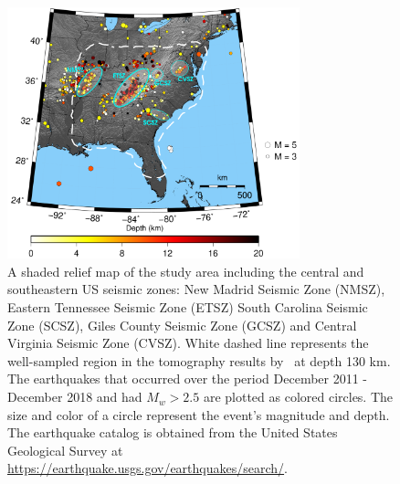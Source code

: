 \documentclass[draft,linenumbers]{agujournal2018}
\begin{document}
\begin{figure}[ht]
    \centering
    \includegraphics[width=20pc]{figures/seismicity_new.png}
    \caption{ A shaded relief map of the study area including the central and southeastern US seismic zones: New Madrid Seismic Zone (NMSZ), Eastern Tennessee  Seismic Zone (ETSZ) South Carolina Seismic Zone (SCSZ), Giles County Seismic Zone (GCSZ) and Central Virginia Seismic Zone (CVSZ). White dashed line represents the well-sampled region in the tomography results by~\citet{Biryol_2016} at depth 130 km. The earthquakes that occurred over the period December 2011 - December 2018 and had $M_{w} > 2.5$ are plotted as colored circles. The size and color of a circle represent the event's magnitude and depth. The earthquake catalog is obtained from the United States Geological Survey at \url{https://earthquake.usgs.gov/earthquakes/search/}.}
    \label{figone}
 \end{figure}
   
    
\end{document}
